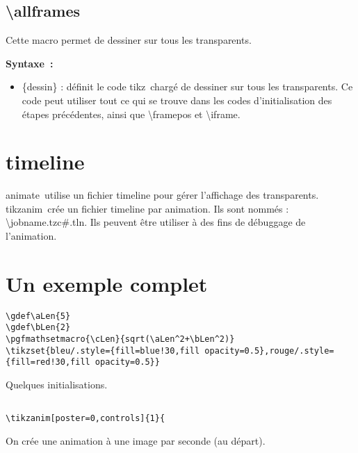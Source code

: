\documentclass[a4paper,12pt]{article}
\newcommand\Tikz{{\ttfamily tikz}}
\newcommand\TikzAnimate{{\ttfamily tikzanim}}
\newcommand\Animate{{\ttfamily animate}}
\begin{document}
\subsection{\ttfamily\textbackslash allframes}

Cette macro permet de dessiner sur tous les transparents.

\textbf{Syntaxe~:}


	\begin{itemize}
		\item {\ttfamily\{dessin\}} : définit le code \Tikz\ chargé de dessiner sur tous les transparents. Ce code peut utiliser tout ce qui se trouve dans
		les codes d'initialisation des étapes précédentes, ainsi que {\ttfamily\textbackslash framepos} et {\ttfamily\textbackslash iframe}.
	\end{itemize}
	
\section{\ttfamily timeline}

\Animate\ utilise un fichier {\ttfamily timeline} pour gérer l'affichage des transparents. \TikzAnimate\ crée un fichier {\ttfamily timeline} par animation. Ils sont nommés : {\ttfamily \textbackslash jobname.tzc\#.tln}. Ils peuvent être utiliser à des fins de débuggage de l'animation.
	
\section{Un exemple complet}

\begin{lstlisting}[name=exemplecomplet]
\gdef\aLen{5}
\gdef\bLen{2}
\pgfmathsetmacro{\cLen}{sqrt(\aLen^2+\bLen^2)}
\tikzset{bleu/.style={fill=blue!30,fill opacity=0.5},rouge/.style={fill=red!30,fill opacity=0.5}} 
\end{lstlisting}

Quelques initialisations.


\begin{lstlisting}[name=exemplecomplet]

\tikzanim[poster=0,controls]{1}{
\end{lstlisting}
On crée une animation à une image par seconde (au départ).
\end{document}
